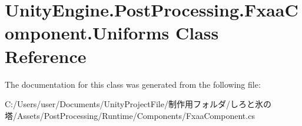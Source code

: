 \hypertarget{class_unity_engine_1_1_post_processing_1_1_fxaa_component_1_1_uniforms}{}\section{Unity\+Engine.\+Post\+Processing.\+Fxaa\+Component.\+Uniforms Class Reference}
\label{class_unity_engine_1_1_post_processing_1_1_fxaa_component_1_1_uniforms}


The documentation for this class was generated from the following file\+:\begin{DoxyCompactItemize}
\item 
C\+:/\+Users/user/\+Documents/\+Unity\+Project\+File/制作用フォルダ/しろと氷の塔/\+Assets/\+Post\+Processing/\+Runtime/\+Components/Fxaa\+Component.\+cs\end{DoxyCompactItemize}
